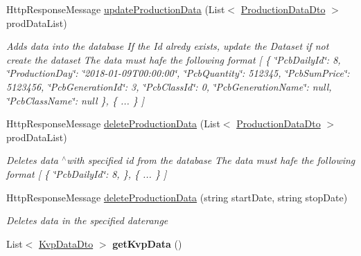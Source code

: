 \begin{DoxyCompactItemize}
Http\+Response\+Message \hyperlink{classkpi_mvc_api_1_1_controllers_1_1_kpidata_controller_a82f308e9ae4809dfdca3ce685af05774}{update\+Production\+Data} (List$<$ \hyperlink{classkpi_mvc_api_1_1_data_transfer_objects_1_1_production_data_dto}{Production\+Data\+Dto} $>$ prod\+Data\+List)
\begin{DoxyCompactList}\small\item\em Adds data into the database If the Id alredy exists, update the Dataset if not create the dataset The data must hafe the following format \mbox{[} \{ \char`\"{}\+Pcb\+Daily\+Id\char`\"{}\+: 8, \char`\"{}\+Production\+Day\char`\"{}\+: \char`\"{}2018-\/01-\/09\+T00\+:00\+:00\char`\"{}, \char`\"{}\+Pcb\+Quantity\char`\"{}\+: 512345, \char`\"{}\+Pcb\+Sum\+Price\char`\"{}\+: 5123456, \char`\"{}\+Pcb\+Generation\+Id\char`\"{}\+: 3, \char`\"{}\+Pcb\+Class\+Id\char`\"{}\+: 0, \char`\"{}\+Pcb\+Generation\+Name\char`\"{}\+: null, \char`\"{}\+Pcb\+Class\+Name\char`\"{}\+: null \}, \{ ... \} \mbox{]} \end{DoxyCompactList}\item 
Http\+Response\+Message \hyperlink{classkpi_mvc_api_1_1_controllers_1_1_kpidata_controller_af1c1e99336a8408bbe4b637cfaaddc4b}{delete\+Production\+Data} (List$<$ \hyperlink{classkpi_mvc_api_1_1_data_transfer_objects_1_1_production_data_dto}{Production\+Data\+Dto} $>$ prod\+Data\+List)
\begin{DoxyCompactList}\small\item\em Deletes data $^\wedge$with specified id from the database The data must hafe the following format \mbox{[} \{ \char`\"{}\+Pcb\+Daily\+Id\char`\"{}\+: 8, \}, \{ ... \} \mbox{]} \end{DoxyCompactList}\item 
Http\+Response\+Message \hyperlink{classkpi_mvc_api_1_1_controllers_1_1_kpidata_controller_a10ba0d225612ba751e0948c601db9a9d}{delete\+Production\+Data} (string start\+Date, string stop\+Date)
\begin{DoxyCompactList}\small\item\em Deletes data in the specified daterange \end{DoxyCompactList}\item 
\mbox{\label{classkpi_mvc_api_1_1_controllers_1_1_kpidata_controller_ae5b9cebd2043650b2fd60caa72e49da7}} 
List$<$ \hyperlink{classkpi_mvc_api_1_1_data_transfer_objects_1_1_kvp_data_dto}{Kvp\+Data\+Dto} $>$ {\bfseries get\+Kvp\+Data} ()
\item 

\end{DoxyCompactItemize}
